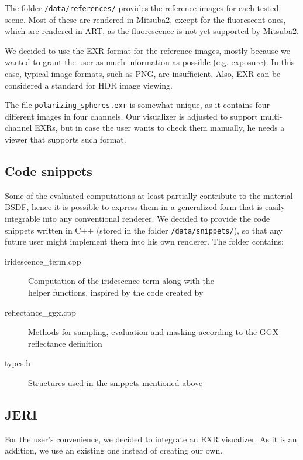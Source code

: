 The folder \texttt{/data/references/} provides the reference images for each tested scene. Most of these are rendered in Mitsuba2, except for the fluorescent ones, which are rendered in ART, as the fluorescence is not yet supported by Mitsuba2.

We decided to use the EXR format for the reference images, mostly because we wanted to grant the user as much information as possible (e.g. exposure). In this case, typical image formats, such as PNG, are insufficient. Also, EXR can be considered a standard for HDR image viewing.

The file \texttt{polarizing\_spheres.exr} is somewhat unique, as it contains four different images in four channels. Our visualizer is adjusted to support multi-channel EXRs, but in case the user wants to check them manually, he needs a viewer that supports such format.

\subsection{Code snippets}

Some of the evaluated computations at least partially contribute to the material BSDF, hence it is possible to express them in a generalized form that is easily integrable into any conventional renderer. We decided to provide the code snippets written in C++ (stored in the folder \texttt{/data/snippets/}), so that any future user might implement them into his own renderer. The folder contains:

\begin{description}
	\item[iridescence\_term.cpp] Computation of the iridescence term along with the \\helper functions, inspired by the code created by \citet{belcour2017practical}
	\item[reflectance\_ggx.cpp] Methods for sampling, evaluation and masking according to the GGX reflectance definition~\cite{walter2007microfacet}
	\item[types.h] Structures used in the snippets mentioned above 
\end{description}

\subsection{JERI}
\label{sec:jeri}

For the user's convenience, we decided to integrate an EXR visualizer. As it is an addition, we use an existing one instead of creating our own.


